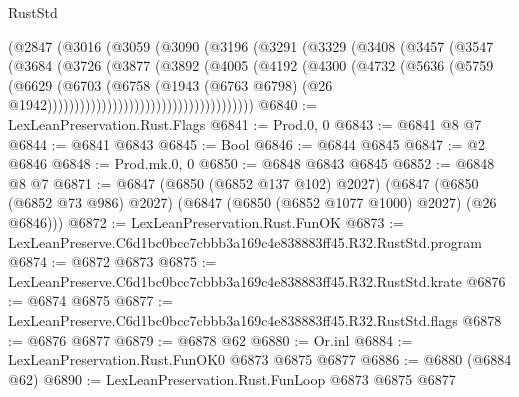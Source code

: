 \begin{lexlean}{RustStd}
\begin{coremodule}
                              (@2847
                                (@3016
                                  (@3059
                                    (@3090
                                      (@3196
                                        (@3291
                                          (@3329
                                            (@3408
                                              (@3457
                                                (@3547
                                                  (@3684
                                                    (@3726
                                                      (@3877
                                                        (@3892
                                                          (@4005
                                                            (@4192
                                                              (@4300
                                                                (@4732
                                                                  (@5636
                                                                    (@5759
                                                                      (@6629
                                                                        (@6703
                                                                          (@6758
                                                                            (@1943
                                                                              (@6763 @6798)
                                                                              (@26
                                                                                @1942))))))))))))))))))))))))))))))))))))))
@6840 := LexLeanPreservation.Rust.Flags
@6841 := Prod.{0, 0}
@6843 := @6841 @8 @7
@6844 := @6841 @6843
@6845 := Bool
@6846 := @6844 @6845
@6847 := @2 @6846
@6848 := Prod.mk.{0, 0}
@6850 := @6848 @6843 @6845
@6852 := @6848 @8 @7
@6871 := @6847
    (@6850 (@6852 @137 @102) @2027)
    (@6847 (@6850 (@6852 @73 @986) @2027) (@6847 (@6850 (@6852 @1077 @1000) @2027) (@26 @6846)))
@6872 := LexLeanPreservation.Rust.FunOK
@6873 := LexLeanPreserve.C6d1bc0bcc7cbbb3a169c4e838883ff45.R32.RustStd.program
@6874 := @6872 @6873
@6875 := LexLeanPreserve.C6d1bc0bcc7cbbb3a169c4e838883ff45.R32.RustStd.krate
@6876 := @6874 @6875
@6877 := LexLeanPreserve.C6d1bc0bcc7cbbb3a169c4e838883ff45.R32.RustStd.flags
@6878 := @6876 @6877
@6879 := @6878 @62
@6880 := Or.inl
@6884 := LexLeanPreservation.Rust.FunOK0 @6873 @6875 @6877
@6886 := @6880 (@6884 @62)
@6890 := LexLeanPreservation.Rust.FunLoop @6873 @6875 @6877

\end{coremodule}
\end{lexlean}
